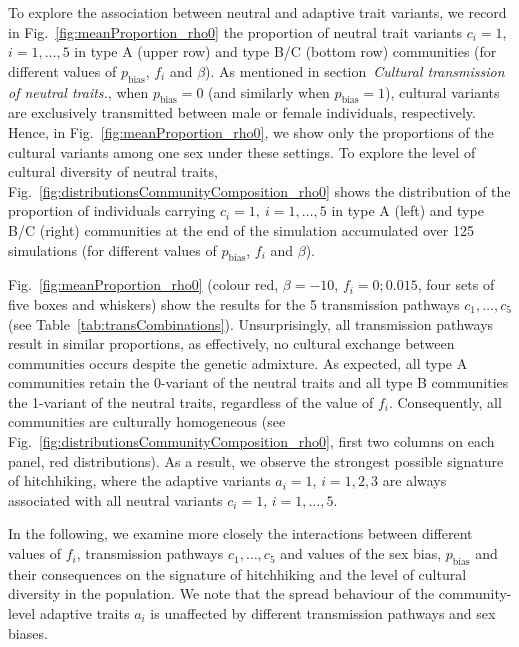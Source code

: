 \documentclass[9pt,twocolumn,twoside,lineno]{pnas-new}
\begin{document}
To explore the association between neutral and adaptive trait variants, we record in Fig.~\ref{fig:meanProportion_rho0} the proportion of neutral trait variants $c_i=1$, $i=1,\ldots,5$ in type A (upper row) and type B/C (bottom row) communities (for different values of $p_\text{bias}$, $f_i$ and $\beta$). As mentioned in section~\textit{Cultural transmission of neutral traits.}, when $p_\text{bias}=0$ (and similarly when $p_\text{bias}=1$), cultural variants are exclusively transmitted between male or female individuals, respectively. Hence, in Fig.~\ref{fig:meanProportion_rho0}, we show only the proportions of the cultural variants among one sex under these settings. 
To explore the level of cultural diversity of neutral traits, Fig.~\ref{fig:distributionsCommunityComposition_rho0} shows the distribution of the proportion of individuals carrying $c_i = 1,\ i = 1,\ldots,5$ in type A (left) and type B/C (right) communities at the end of the simulation accumulated over 125 simulations (for different values of $p_\text{bias}$, $f_i$ and $\beta$).

Fig.~\ref{fig:meanProportion_rho0} (colour red, $\beta=-10$, $f_i=0;0.015$, four sets of five boxes and whiskers) show the results for the 5 transmission pathways $c_1,\ldots,c_5$ (see Table~\ref{tab:transCombinations}). 
Unsurprisingly, all transmission pathways result in similar proportions, as effectively, no cultural exchange between communities occurs despite the genetic admixture. 
As expected, all type A communities retain the 0-variant of the neutral traits and all type B communities the 1-variant of the neutral traits, regardless of the value of $f_i$. 
Consequently, all communities are culturally homogeneous (see Fig.~\ref{fig:distributionsCommunityComposition_rho0}, first two columns on each panel, red distributions). As a result, we observe the strongest possible signature of hitchhiking, where the adaptive variants $a_i=1$, $i=1,2,3$ are always associated with all neutral variants $c_i=1$, $i=1,\ldots,5$.  


In the following, we examine more closely the interactions between different values of $f_i$, transmission pathways $c_1,\ldots,c_5$ and values of the sex bias, $p_\text{bias}$ and their consequences on the signature of hitchhiking and the level of cultural diversity in the population. We note that the spread behaviour of the community-level adaptive traits $a_i$ is unaffected by different transmission pathways and sex biases. 
\end{document}
